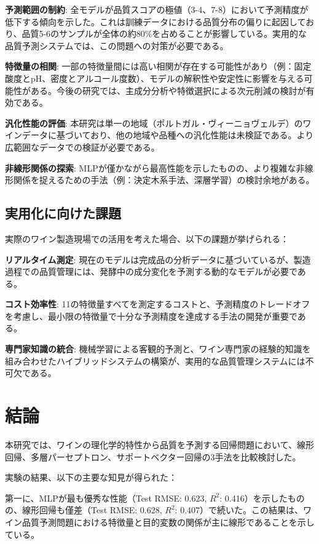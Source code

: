\documentclass[12pt,a4paper,dvipdfmx]{jsarticle}
\begin{document}
\textbf{予測範囲の制約}: 全モデルが品質スコアの極値（3-4、7-8）において予測精度が低下する傾向を示した。これは訓練データにおける品質分布の偏りに起因しており、品質5-6のサンプルが全体の約80\%を占めることが影響している。実用的な品質予測システムでは、この問題への対策が必要である。

\textbf{特徴量の相関}: 一部の特徴量間には高い相関が存在する可能性があり（例：固定酸度とpH、密度とアルコール度数）、モデルの解釈性や安定性に影響を与える可能性がある。今後の研究では、主成分分析や特徴選択による次元削減の検討が有効である。

\textbf{汎化性能の評価}: 本研究は単一の地域（ポルトガル・ヴィーニョヴェルデ）のワインデータに基づいており、他の地域や品種への汎化性能は未検証である。より広範囲なデータでの検証が必要である。

\textbf{非線形関係の探索}: MLPが僅かながら最高性能を示したものの、より複雑な非線形関係を捉えるための手法（例：決定木系手法、深層学習）の検討余地がある。

\subsection{実用化に向けた課題}

実際のワイン製造現場での活用を考えた場合、以下の課題が挙げられる：

\textbf{リアルタイム測定}: 現在のモデルは完成品の分析データに基づいているが、製造過程での品質管理には、発酵中の成分変化を予測する動的なモデルが必要である。

\textbf{コスト効率性}: 11の特徴量すべてを測定するコストと、予測精度のトレードオフを考慮し、最小限の特徴量で十分な予測精度を達成する手法の開発が重要である。

\textbf{専門家知識の統合}: 機械学習による客観的予測と、ワイン専門家の経験的知識を組み合わせたハイブリッドシステムの構築が、実用的な品質管理システムには不可欠である。

\section{結論}

本研究では、ワインの理化学的特性から品質を予測する回帰問題において、線形回帰、多層パーセプトロン、サポートベクター回帰の3手法を比較検討した。

実験の結果、以下の主要な知見が得られた：

第一に、MLPが最も優秀な性能（Test RMSE: 0.623, $R^2$: 0.416）を示したものの、線形回帰も僅差（Test RMSE: 0.628, $R^2$: 0.407）で続いた。この結果は、ワイン品質予測問題における特徴量と目的変数の関係が主に線形であることを示している。
\end{document}

